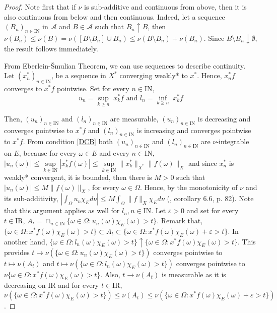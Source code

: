 \documentclass[preprint,authoryear,12pt]{article}%
\theoremstyle{definition}
\renewcommand{\AA}{{\mathcal A}}
\newcommand{\IR}{{\mathrm{I\!R}}}
\newcommand{\IN}{{\mathrm{I\!N}}}
\begin{document}
\begin{proof}

Note first that if $\nu$ is sub-additive and continuous from above, then it is also continuous from below and then continuous. 
Indeed, let a sequence $(B_n)_{n\in \IN}$ in $\AA$ and $B\in \AA$ such that $B_n\uparrow B$, then $\nu(B_n)\leq \nu(B)=\nu([B\setminus B_n] \cup B_n)\leq \nu(B\setminus B_n)+\nu(B_n)$. Since $B\setminus B_n\downarrow \emptyset$, the result follows immediately.

From Eberlein-\v Smulian Theorem, we can use sequences to describe continuity. Let $(x_n^*)_{n\in \IN}$, be a sequence in $X^*$ converging weakly* to $x^*$. Hence, $x^*_n f$ converges to $x^* f$ pointwise. Set for every $n\in \IN,$
$$u_n=\underset{k\geq n}{\sup}\; x_k^*f\text{ and }l_n=\underset{k\geq n}{\inf}\; x_k^*f$$

Then, $(u_n)_{n\in \IN}$ and $(l_n)_{n\in \IN}$ are measurable, $(u_n)_{n\in \IN}$ is decreasing and converges pointwise to $x^*f$ and   $(l_n)_{n\in \IN}$ is increasing and converges pointwise to $x^*f$. From condition \eqref{DCB} both $(u_n)_{n\in \IN}$ and $(l_n)_{n\in \IN}$ are $\nu$-integrable on $E$, because for every $\omega\in E$ and every $n\in \IN$, $|u_n(\omega)|\leq \underset{k\in \IN}{\sup}|x^*_k f(\omega)|\leq \underset{k\in \IN}{\sup}\|x^*_k\|_{X^*} \|f(\omega)\|_X$ and since $x^*_n$ is weakly* convergent, it is bounded, then there is $M>0$ such that $|u_n(\omega)|\leq  M\|f(\omega)\|_X$, for every $\omega\in \Omega$. Hence, by the monotonicity of $\nu$ and its sub-additivity, $|\int_\Omega u_n \chi_E d\nu |\leq M \int_\Omega \|f\|_X \chi_E d\nu$ (\citet{DEN94}, corollary 6.6, p. 82). Note that this argument applies as well for $l_n,n\in \IN$. Let $\varepsilon>0$ and set for every $t\in \IR$, $A_t=\cap_{n\in \IN}\{\omega\in \Omega: u_n(\omega)\chi_E(\omega)>t\}$. Remark that, $\{\omega\in \Omega: x^* f(\omega)\chi_E(\omega)>t\}\subset A_t\subset \{\omega\in \Omega: x^* f(\omega)\chi_E(\omega)+\varepsilon>t\}$. In another hand, $\{\omega\in \Omega: l_n(\omega)\chi_E(\omega)>t\}\uparrow \{\omega\in \Omega: x^* f(\omega)\chi_E(\omega)>t\}$. This provides  $t\mapsto \nu(\{\omega\in \Omega: u_n(\omega)\chi_E(\omega)>t\})$ converges pointwise to $t\mapsto \nu(A_t)$ and $t\mapsto \nu(\{\omega\in \Omega: l_n(\omega)\chi_E(\omega)>t\})$ converges pointwise to $\nu\{\omega\in \Omega: x^* f(\omega)\chi_E(\omega)>t\}$. Also, $t\rightarrow \nu(A_t)$ is measurable as it is decreasing on $\IR$ and for every $t\in \IR$, $\nu(\{\omega\in \Omega: x^* f(\omega)\chi_E(\omega)>t\})\leq \nu( A_t) \leq \nu(\{\omega\in \Omega: x^* f(\omega)\chi_E(\omega)+\varepsilon>t\})$.  


\end{proof}
\end{document}

